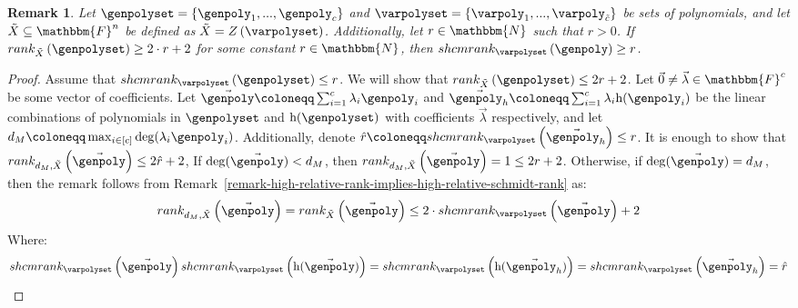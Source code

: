 \documentclass[10pt,a4paper]{article}
\newtheorem{remark}[theorem]{Remark}
\newcommand{\definedas}[0]{\coloneqq}
\newcommand{\parens}[1]{\left( #1 \right)}
\newcommand{\sparens}[1]{\left[ #1 \right]}
\newcommand{\set}[1]{\left\{ #1 \right\}}
\newcommand{\basefield}[0]{\mathbbm{F}}
\newcommand{\blocklength}[0]{n}
\newcommand{\field}[0]{\basefield^{\blocklength}}
\newcommand{\degree}[0]{d}
\newcommand{\naturalnumbersset}[0]{\mathbbm{N}}
\newcommand{\variety}{{\tilde{X}}}
\newcommand{\varietypolycount}{{\tilde{c}}}
\newcommand{\homopart}[1]{\mathrm{h}({#1})}
\newcommand{\zerofunc}[1]{Z \parens{#1}}
\newcommand{\relschmrank}[2]{shcmrank_{#1}\parens{{#2}}}
\newcommand{\relrank}[2]{rank_{#1} \parens{#2}}
\newcommand{\drelrank}[3]{rank_{{#1}, {#2}} \parens{#3}}
\newcommand{\rankval}[0]{{{r}}}
\begin{document}
\begin{remark}
    Let $\genpolyset = \set{\genpoly_1,...,\genpoly_c}$ and $\varpolyset = \set{\varpoly_1,...,\varpoly_{\varietypolycount}}$ be sets of polynomials,
    and let $\variety \subseteq \field$ be defined as $\variety = \zerofunc{\varpolyset}$.
    Additionally, let $\rankval \in \naturalnumbersset$ such that $\rankval > 0$.
    If $\relrank{\variety}{\genpolyset} \geq 2 \cdot \rankval + 2$ for some constant $\rankval \in \naturalnumbersset$, then $\relschmrank{\varpolyset}{\genpoly} \geq r$.
\end{remark}
\begin{proof}
    Assume that $\relschmrank{\varpolyset}{\genpolyset} \leq \rankval$.
    We will show that $\relrank{\variety}{\genpolyset} \leq 2\rankval + 2$.
    Let $\vec{0} \neq \vec{\lambda} \in \basefield^c$ be some vector of coefficients.
    Let $\vec{\genpoly} \definedas \sum_{i=1}^{c} {\lambda_i \genpoly_i}$ and $\vec{\genpoly_h} \definedas \sum_{i=1}^{c} {\lambda_i \homopart{\genpoly_i}}$
    be the linear combinations of polynomials in $\genpolyset$ and $\homopart{\genpolyset}$ with coefficients $\vec{\lambda}$ respectively,
    and let $\degree_M \definedas \max_{i \in \sparens{c}}{\deg(\lambda_i \genpoly_i)}$.
    Additionally, denote $\hat{\rankval} \definedas \relschmrank{\varpolyset}{\vec{\genpoly_h}} \leq \rankval$.
    It is enough to show that $\drelrank{\degree_M}{\variety}{\vec{\genpoly}} \leq 2 \hat{\rankval} + 2$,
    If $\deg(\vec{\genpoly}) < \degree_M$, then $\drelrank{\degree_M}{\variety}{\vec{\genpoly}} = 1 \leq 2 \rankval + 2$.
    Otherwise, if $\deg(\vec{\genpoly}) = \degree_M$, then the remark follows from Remark~\ref{remark-high-relative-rank-implies-high-relative-schmidt-rank}
    as:
    \[
        \drelrank{\degree_M}{\variety}{\vec{\genpoly}} =
        \relrank{\variety}{\vec{\genpoly}} \leq
        2 \cdot \relschmrank{\varpolyset}{\vec{\genpoly}} + 2
    \]
    Where:
    \[
        \relschmrank{\varpolyset}{\vec{\genpoly}}
        \relschmrank{\varpolyset}{\homopart{\vec{\genpoly}}} =
        \relschmrank{\varpolyset}{\homopart{\vec{\genpoly_h}}} =
        \relschmrank{\varpolyset}{\vec{\genpoly_h}} =
        \hat{\rankval}
    \]
\end{proof}
\end{document}
